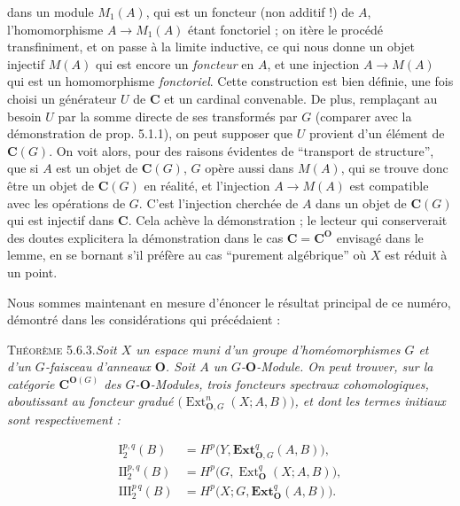 \clearpage
{}

\noindent dans un module $M_1(A)$, qui est un foncteur (non additif !) de $A$,
l'homomorphisme $A\to M_1(A)$ étant fonctoriel ; on itère le
procédé transfiniment, et on passe à la limite inductive, ce qui nous donne un
objet injectif $M(A)$ qui est encore un \textit{foncteur} en $A$, et une injection
$A\to M(A)$ qui est un homomorphisme \textit{fonctoriel}. Cette
construction est bien définie, une fois choisi un générateur $U$ de ${\mathbf C}$ et un
cardinal convenable. De plus, remplaçant au besoin $U$ par la somme directe de
ses transformés par $G$ (comparer avec la démonstration de prop. 5.1.1), on
peut supposer que $U$ provient d'un élément de ${\mathbf C}(G)$. On voit alors, pour des
raisons évidentes de ``transport de structure'', que si $A$ est un objet de
${\mathbf C}(G)$, $G$ opère aussi dans $M(A)$, qui se trouve donc être un objet de
${\mathbf C}(G)$ en réalité, et l'injection $A\to M(A)$ est compatible avec
les opérations de $G$. C'est l'injection cherchée de $A$ dans un objet de
${\mathbf C}(G)$ qui est injectif dans ${\mathbf C}$.
Cela achève la démonstration ; le lecteur qui conserverait des doutes
explicitera la démonstration dans le cas ${\mathbf C}={\mathbf C}^{\mathbf O}$ envisagé dans le lemme, en se
bornant s'il préfère au cas ``purement algébrique'' où $X$ est réduit à un
point.

Nous sommes maintenant en mesure d'énoncer le résultat principal de ce
numéro, démontré dans les considérations qui précédaient :

\textsc{Théorème 5.6.3.}\quad \textit{Soit $X$ un espace muni d'un
groupe d'homéomorphismes $G$ et d'un $G$-faisceau d'anneaux ${\mathbf O}$. Soit $A$ un
$G$-${\mathbf O}$-Module. On peut trouver, sur la catégorie ${\mathbf C}^{{\mathbf O}(G)}$ des
$G$-${\mathbf O}$-Modules, trois foncteurs spectraux cohomologiques, aboutissant au
foncteur gradué $\bigl(\operatorname{Ext}_{{\mathbf O},G}^n(X;A,B)\bigr)$, et dont les
termes initiaux sont respectivement :}

\begin{equation}
\begin{aligned}
\mathrm I_2^{p,q}(B)
  &=H^p\bigl(Y,\mathbf{Ext}_{{\mathbf O},G}^q(A,B)\bigr),\\
\mathrm {II}_2^{p,q}(B)
  &=H^p\bigl(G,\operatorname{Ext}_{\mathbf O}^q(X;A,B)\bigr),\\
\mathrm {III}_2^{p\,q}(B)
  &=H^p\bigl(X;G,\mathbf{Ext}_{\mathbf O}^q(A,B)\bigr).
\end{aligned}
\tag{5.6.11}
\end{equation}

